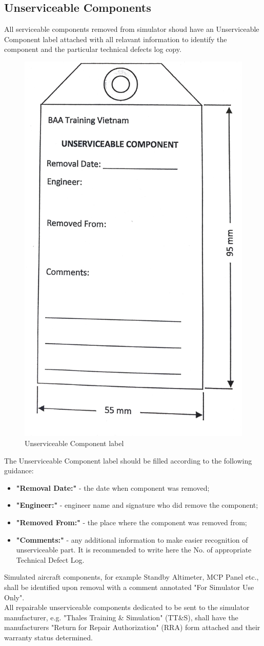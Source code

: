    \subsection{Unserviceable Components}
        All serviceable components removed from simulator shoud have an Unserviceable Component label attached with all relavant information to identify the component and the 
        particular technical defects log copy.
        \begin{figure}[H]
            \centering
            \includegraphics[width=0.6\linewidth]{img/label.JPG}
            \caption{Unserviceable Component label}
        \end{figure}
        The Unserviceable Component label should be filled according to the following guidance:
        \begin{itemize}
            \item \textbf{"Removal Date:"} - the date when component was removed;
            \item \textbf{"Engineer:"} - engineer name and signature who did remove the component;
            \item \textbf{"Removed From:"} - the place where the component was removed from;
            \item \textbf{"Comments:"} - any additional information to make easier recognition of unserviceable part. It is recommended to write here the No. of appropriate 
            Technical Defect Log.
        \end{itemize}
        Simulated aircraft components, for example Standby Altimeter, MCP Panel etc., shall be identified upon removal with a comment annotated "For Simulator Use Only". \\ 
        \vspace{3mm}
        All repairable unserviceable components dedicated to be sent to the simulator manufacturer, e.g. "Thales Training \& Simulation" (TT\&S), shall have the manufacturers 
        "Return for Repair Authorization" (RRA) form attached and their warranty status determined. 

